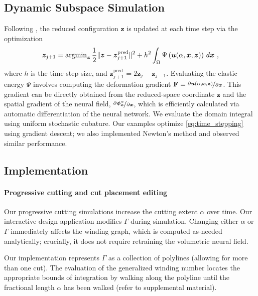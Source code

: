\subsection{Dynamic Subspace Simulation}
\label{sec:reduced}
Following \citet{chang:2023:licrom}, the reduced configuration $\bm{z}$ is updated at each time step via the optimization
\begin{align} 
\label{eq:time_stepping}
 \bm{z}_{j+1} = \operatorname{argmin}_{\bm{z}} \frac{1}{2} \|\bm{z} - \bm{z}_{j+1}^{\text{pred}} \|^2 + h^2 \int_{\Omega} \Psi\left( \bm{u}({\color{black}{\alpha}}, \bm{x}, \bm{z}) \right) \, d\bm{x} \ ,
\end{align}
where $h$ is the time step size, and $\bm{z}_{j+1}^{\text{pred}} = 2\bm{z}_{j} - \bm{z}_{j-1}$. Evaluating the elastic energy $\Psi$ involves computing the deformation gradient $\mathbf{F} = \nicefrac{\partial \bm{u}(\alpha, \bm{x}, \bm{z})}{\partial \bm{x}}$. This gradient can be directly obtained from the reduced-space coordinate $\bm{z}$ and the spatial gradient of the neural field, $\nicefrac{\partial \bm{\phi}_{\bm{x}}^{\alpha}}{\partial \bm{x}}$, which is efficiently calculated via automatic differentiation of the neural network. We evaluate the domain integral using uniform stochastic cubature. Our examples optimize \eqref{eq:time_stepping} using gradient descent; we also implemented Newton's method and observed similar performance.

\subsection{Implementation}

\paragraph{Progressive cutting and cut placement editing}
Our progressive cutting simulations increase the cutting extent $\alpha$ over time. Our interactive design application modifies $\Gamma$ during simulation. Changing either $\alpha$ or $\Gamma$ immediately affects the winding graph, which is computed as-needed analytically; crucially, it does not require retraining the volumetric neural field.

Our implementation represents $\Gamma$ as a collection of polylines (allowing for more than one cut). The evaluation of the generalized winding number locates the appropriate bounds of integration by walking along the polyline until the fractional length $\alpha$ has been walked (refer to supplemental material).

